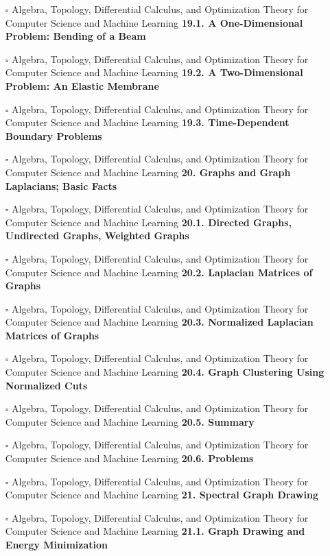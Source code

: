 \documentclass[a4, landscape, 12pt]{article}
\newcommand{\checkbox}{$\square$}%
\begin{document}
\begin{itemize}
{}
\item [\checkbox]  Algebra, Topology, Differential Calculus, and Optimization Theory for Computer Science and Machine Learning \textbf{ 19.1. A One-Dimensional Problem: Bending of a Beam
}
\item [\checkbox]  Algebra, Topology, Differential Calculus, and Optimization Theory for Computer Science and Machine Learning \textbf{ 19.2. A Two-Dimensional Problem: An Elastic Membrane
}
\item [\checkbox]  Algebra, Topology, Differential Calculus, and Optimization Theory for Computer Science and Machine Learning \textbf{ 19.3. Time-Dependent Boundary Problems
}
\item [\checkbox]  Algebra, Topology, Differential Calculus, and Optimization Theory for Computer Science and Machine Learning \textbf{ 20. Graphs and Graph Laplacians; Basic Facts
}
\item [\checkbox]  Algebra, Topology, Differential Calculus, and Optimization Theory for Computer Science and Machine Learning \textbf{ 20.1. Directed Graphs, Undirected Graphs, Weighted Graphs
}
\item [\checkbox]  Algebra, Topology, Differential Calculus, and Optimization Theory for Computer Science and Machine Learning \textbf{ 20.2. Laplacian Matrices of Graphs
}
\item [\checkbox]  Algebra, Topology, Differential Calculus, and Optimization Theory for Computer Science and Machine Learning \textbf{ 20.3. Normalized Laplacian Matrices of Graphs
}
\item [\checkbox]  Algebra, Topology, Differential Calculus, and Optimization Theory for Computer Science and Machine Learning \textbf{ 20.4. Graph Clustering Using Normalized Cuts
}
\item [\checkbox]  Algebra, Topology, Differential Calculus, and Optimization Theory for Computer Science and Machine Learning \textbf{ 20.5. Summary
}
\item [\checkbox]  Algebra, Topology, Differential Calculus, and Optimization Theory for Computer Science and Machine Learning \textbf{ 20.6. Problems
}
\item [\checkbox]  Algebra, Topology, Differential Calculus, and Optimization Theory for Computer Science and Machine Learning \textbf{ 21. Spectral Graph Drawing
}
\item [\checkbox]  Algebra, Topology, Differential Calculus, and Optimization Theory for Computer Science and Machine Learning \textbf{ 21.1. Graph Drawing and Energy Minimization
}
\end{itemize}
\end{document}
